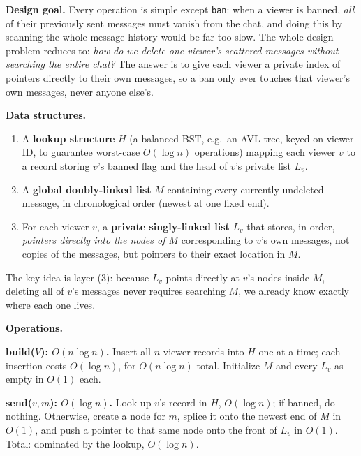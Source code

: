 \documentclass[12pt,twoside]{article}
\begin{document}
\begin{problems}
\newpage
\problem  %

\textbf{Design goal.}
Every operation is simple except \texttt{ban}: when a viewer is banned, \emph{all} of their
previously sent messages must vanish from the chat, and doing this by scanning the whole message
history would be far too slow. The whole design problem reduces to: \emph{how do we delete one
viewer's scattered messages without searching the entire chat?} The answer is to give each viewer
a private index of pointers directly to their own messages, so a ban only ever touches that
viewer's own messages, never anyone else's.

\textbf{Data structures.}

\begin{enumerate}
  \item A \textbf{lookup structure} $H$ (a balanced BST, e.g.\ an AVL tree, keyed on viewer ID,
        to guarantee worst-case $O(\log n)$ operations) mapping each viewer $v$ to a record
        storing $v$'s banned flag and the head of $v$'s private list $L_v$.
  \item A \textbf{global doubly-linked list} $M$ containing every currently undeleted message, in
        chronological order (newest at one fixed end).
  \item For each viewer $v$, a \textbf{private singly-linked list} $L_v$ that stores, in order,
        \emph{pointers directly into the nodes of $M$} corresponding to $v$'s own messages, not
        copies of the messages, but pointers to their exact location in $M$.
\end{enumerate}

The key idea is layer (3): because $L_v$ points directly at $v$'s nodes inside $M$, deleting all
of $v$'s messages never requires searching $M$, we already know exactly where each one lives.

\textbf{Operations.}

\textbf{build($V$): $O(n\log n)$.}
Insert all $n$ viewer records into $H$ one at a time; each insertion costs $O(\log n)$, for
$O(n\log n)$ total. Initialize $M$ and every $L_v$ as empty in $O(1)$ each.

\textbf{send($v,m$): $O(\log n)$.}
Look up $v$'s record in $H$, $O(\log n)$; if banned, do nothing. Otherwise, create a node for $m$,
splice it onto the newest end of $M$ in $O(1)$, and push a pointer to that same node onto the
front of $L_v$ in $O(1)$. Total: dominated by the lookup, $O(\log n)$.


\end{problems}
\end{document}
